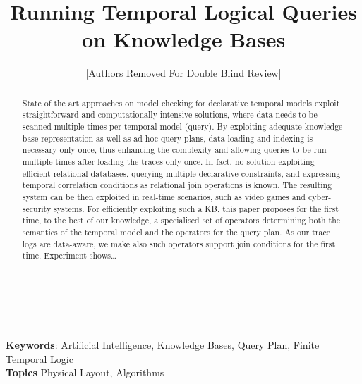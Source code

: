 \documentclass[11pt]{article}
\begin{document}
\title{Running Temporal Logical Queries on Knowledge Bases}

\author{[Authors Removed For Double Blind Review]}

\maketitle
~\\
\begin{abstract}
State of the art approaches on model checking for declarative temporal models exploit straightforward and computationally intensive solutions, where data needs to be scanned multiple times per temporal model (query). By exploiting adequate knowledge base representation as well as ad hoc query plans, data loading and indexing is necessary only once, thus enhancing the complexity and allowing queries to be run multiple times after loading the traces only once. In fact, no solution exploiting efficient relational databases, querying multiple declarative constraints, and expressing temporal correlation conditions as relational join operations is known. The resulting system can be then exploited in real-time scenarios, such as video games and cyber-security systems. For efficiently exploiting such a KB, this paper proposes for the first time, to the best of our knowledge, a specialised set of operators determining both the semantics of the temporal model and the operators for the query plan. As our trace logs are data-aware, we make also such operators support join conditions for the first time. Experiment shows\dots
\end{abstract}
~\\

{\bf Keywords}: Artificial Intelligence, Knowledge Bases, Query Plan, Finite Temporal Logic
~\\

{\bf Topics} Physical Layout, Algorithms
~\\















  
  
\end{document}
